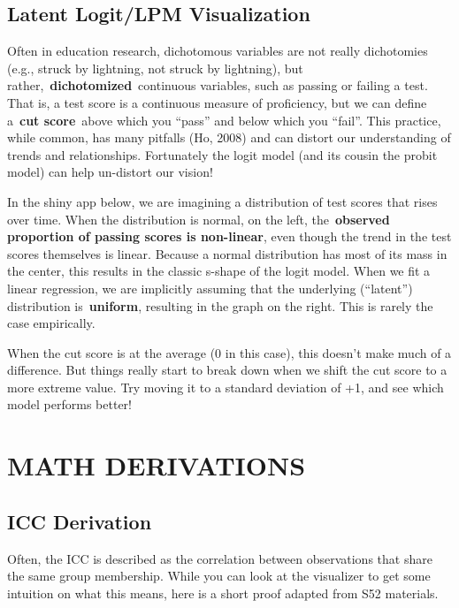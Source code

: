 \documentclass[
  letterpaper,
  DIV=11,
  numbers=noendperiod]{scrreprt}
\begin{document}
\chapter{Latent Logit/LPM
Visualization}\label{latent-logitlpm-visualization}

Often in education research, dichotomous variables are not really
dichotomies (e.g., struck by lightning, not struck by lightning), but
rather,~\textbf{dichotomized}~continuous variables, such as passing or
failing a test. That is, a test score is a continuous measure of
proficiency, but we can define a~\textbf{cut score}~above which you
``pass'' and below which you ``fail''. This practice, while common, has
many pitfalls (Ho, 2008) and can distort our understanding of trends and
relationships. Fortunately the logit model (and its cousin the probit
model) can help un-distort our vision!

In the shiny app below, we are imagining a distribution of test scores
that rises over time. When the distribution is normal, on the left,
the~\textbf{observed proportion of passing scores is non-linear}, even
though the trend in the test scores themselves is linear. Because a
normal distribution has most of its mass in the center, this results in
the classic s-shape of the logit model. When we fit a linear regression,
we are implicitly assuming that the underlying (``latent'') distribution
is~\textbf{uniform}, resulting in the graph on the right. This is rarely
the case empirically.

When the cut score is at the average (0 in this case), this doesn't make
much of a difference. But things really start to break down when we
shift the cut score to a more extreme value. Try moving it to a standard
deviation of +1, and see which model performs better!

\part{MATH DERIVATIONS}

\chapter{ICC Derivation}\label{icc-derivation}

Often, the ICC is described as the correlation between observations that
share the same group membership. While you can look at the visualizer to
get some intuition on what this means, here is a short proof adapted
from S52 materials.
\end{document}
